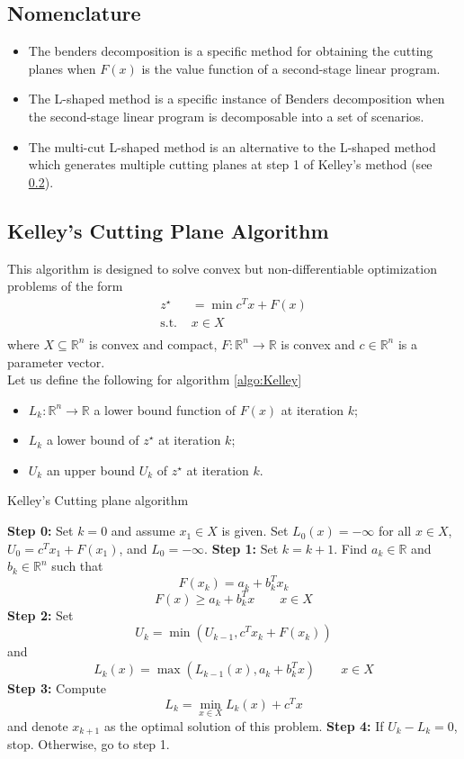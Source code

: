 \documentclass[12pt, openany]{report}
\newcommand{\R}{\mathbb{R}}
\theoremstyle{definition}
\begin{document}
\subsection{Nomenclature}
\begin{itemize}
	\item The benders decomposition is a specific method for obtaining the cutting planes when $F(x)$ is the value function of a second-stage linear program. 
	\item The L-shaped method is a specific instance of Benders decomposition when the second-stage linear program is decomposable into a set of scenarios.
	\item The multi-cut L-shaped method is an alternative to the L-shaped method which generates multiple cutting planes at step 1 of Kelley's method (see \ref{sec:Kelley}). 
\end{itemize}
\subsection{Kelley's Cutting Plane Algorithm}\label{sec:Kelley}
This algorithm is designed to solve convex but non-differentiable optimization problems of the form
\begin{equation}
	\begin{aligned}
		z^\star &= \min c^Tx + F(x)\\
		\text{s.t. }& x\in X\\
	\end{aligned}
\end{equation}
where $X\subseteq \R^n$ is convex and compact, $F:\R^n\to \R$ is convex and $c\in \R^n$ is a parameter vector. \\
Let us define the following for algorithm \ref{algo:Kelley}
\begin{itemize}
	\item $L_k:\R^n\to \R$ a lower bound function of $F(x)$ at iteration $k$;
	\item $L_k$ a lower bound of $z^\star$ at iteration $k$;
	\item $U_k$ an upper bound $U_k$ of $z^\star$ at iteration $k$.
\end{itemize}
\begin{algorithm}
    \caption{Kelley's Cutting plane algorithm}
	\label{algo:Kelley}
    \begin{algorithmic}[1]
    \State \textbf{Step 0:} Set $k=0$ and assume $x_1\in X$ is given. Set $L_0(x)=-\infty$ for all $x\in X$, $U_0 = c^Tx_1 + F(x_1)$, and $L_0 = -\infty$.
	\State \textbf{Step 1:} Set $k=k+1$. Find $a_k\in \R$ and $b_k\in \R^n$ such that \[F(x_k)=a_k+b_k^Tx_k\] \[F(x)\ge a_k + b_k^Tx\qquad x\in X\]
	\State \textbf{Step 2:} Set \[U_k = \min(U_{k-1},c^Tx_k + F(x_k))\] and \[L_k(x) = \max(L_{k-1}(x),a_k+b_k^Tx) \qquad x\in X\]
	\State \textbf{Step 3:} Compute \[L_k = \min_{x\in X} L_k(x) + c^Tx\] and denote $x_{k+1}$ as the optimal solution of this problem.
	\State \textbf{Step 4:} If $U_k - L_k =0$, stop. Otherwise, go to step 1.
    \end{algorithmic}
\end{algorithm}
\end{document}
